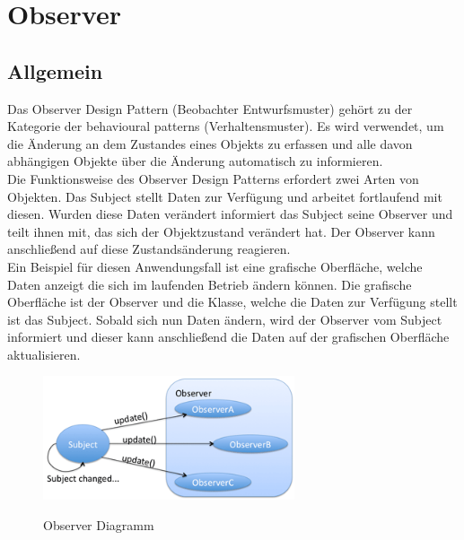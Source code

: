 
\chapter{Observer}

\section{Allgemein}
Das Observer Design Pattern (Beobachter Entwurfsmuster) gehört zu der Kategorie der behavioural 
patterns (Verhaltensmuster). Es wird verwendet, um die Änderung an dem Zustandes eines Objekts zu
erfassen und alle davon abhängigen Objekte über die Änderung automatisch zu
informieren.\\
\newline
Die Funktionsweise des Observer Design Patterns erfordert zwei Arten von Objekten. Das Subject 
stellt Daten zur Verfügung und arbeitet fortlaufend mit diesen. Wurden diese Daten verändert
informiert das Subject seine Observer und teilt ihnen mit, das sich der Objektzustand verändert 
hat. Der Observer kann anschließend auf diese Zustandsänderung reagieren.\\
\newline
Ein Beispiel für diesen Anwendungsfall ist eine grafische Oberfläche, welche Daten anzeigt 
die sich im laufenden Betrieb ändern können. Die grafische Oberfläche ist der Observer und die 
Klasse, welche die Daten zur Verfügung stellt ist das Subject. Sobald sich nun Daten ändern, 
wird der Observer vom Subject informiert und dieser kann anschließend die Daten auf der 
grafischen Oberfläche aktualisieren.\\
\newline

\begin{figure}[!htbp]
	\centering
	\includegraphics[width=0.66\textwidth]{content/pictures/Observer/observer01.png}
	\label{pic:bild}
	\caption{Observer Diagramm \cite{paulObserver}}
\end{figure}

